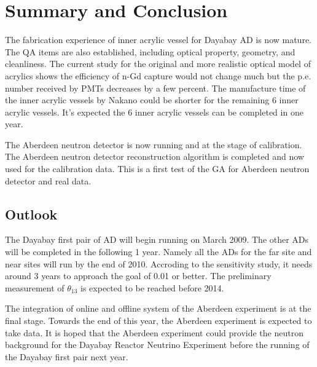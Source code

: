 \chapter {Summary and Conclusion}

The fabrication experience of inner acrylic vessel for Dayabay AD
is now mature.
The QA items are also established, including optical property, geometry, and
cleanliness.
The current study for the original and more realistic optical model of acrylics
shows the efficiency of n-Gd capture would not change much but the p.e.
number received by PMTs decreases by a few percent.
The manufacture time of the inner acrylic vessels by Nakano
could be shorter for the remaining 6 inner acrylic vessels.
It's expected the 6 inner acrylic vessels can be completed in one year.

The Aberdeen neutron detector is now running and at the stage of calibration.
The Aberdeen neutron detector reconstruction algorithm is completed and
now used for the calibration data.
This is a first test of the GA for Aberdeen neutron detector and real data.


\section {Outlook}

The Dayabay first pair of AD will begin running on March 2009.
The other ADs will be completed in the following 1 year.
Namely all the ADs for the far site and near sites
will run by the end of 2010.
Accroding to the sensitivity study,
it needs around 3 years to approach the goal of 0.01 or better.
The preliminary measurement of $\theta_{13}$ is expected
to be reached before 2014.


The integration of online and offline system of the Aberdeen experiment is at the final stage.
Towards the end of this year, the Aberdeen experiment is expected to take data.
It is hoped that the Aberdeen experiment could provide the neutron background for
the Dayabay Reactor Neutrino Experiment before the running of the Dayabay first pair next year.


